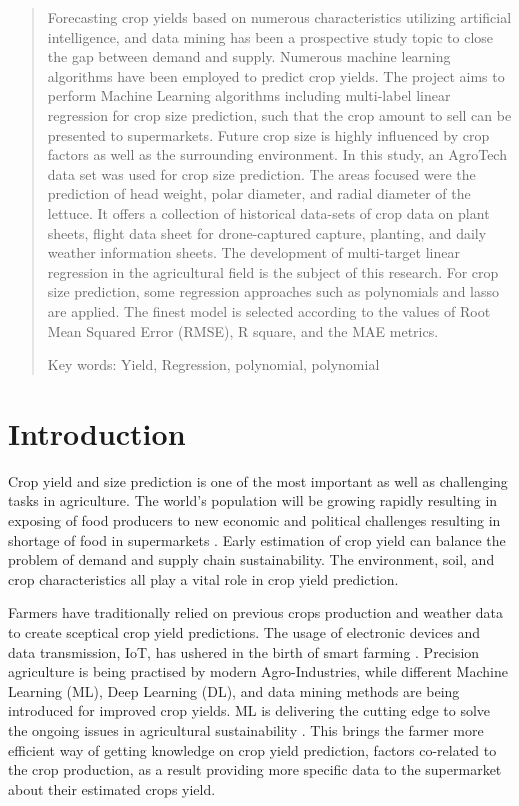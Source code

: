 \documentclass{article}
\begin{document}
\begin{abstract}
Forecasting crop yields based on numerous characteristics utilizing artificial intelligence, and data mining has been a prospective study topic to close the gap between demand and supply. Numerous machine learning algorithms have been employed to predict crop yields. The project aims to perform Machine Learning algorithms including multi-label linear regression for crop size prediction, such that the crop amount to sell can be presented to supermarkets. Future crop size is highly influenced by crop factors as well as the surrounding environment. In this study, an AgroTech data set was used for crop size prediction. The areas focused were the prediction of head weight, polar diameter, and radial diameter of the lettuce. It offers a collection of historical data-sets of crop data on plant sheets, flight data sheet for drone-captured capture, planting, and daily weather information sheets. The development of multi-target linear regression in the agricultural field is the subject of this research. For crop size prediction, some regression approaches such as polynomials and lasso are applied. The finest model is selected according to the values of Root Mean Squared Error (RMSE), R square, and the MAE metrics.

Key words: Yield, Regression, polynomial, polynomial
\end{abstract}


\section{Introduction}
Crop yield and size prediction is one of the most important as well as challenging tasks in agriculture. The world's population will be growing rapidly resulting in exposing of food producers to new economic and political challenges resulting in shortage of food in supermarkets \cite{britain2011government}. Early estimation of crop yield can balance the problem of demand and supply chain sustainability. The environment, soil, and crop characteristics all play a vital role in crop yield prediction.

Farmers have traditionally relied on previous crops production and weather data to create sceptical crop yield predictions. The usage of electronic devices and data transmission, IoT, has ushered in the birth of smart farming \cite{PIVOTO201821}. Precision agriculture is being practised by modern Agro-Industries, while different Machine Learning (ML), Deep Learning (DL), and data mining methods are being introduced for improved crop yields. ML is delivering the cutting edge to solve the ongoing issues in agricultural sustainability \cite{9311735}. This brings the farmer more efficient way of getting knowledge on crop yield prediction, factors co-related to the crop production, as a result providing more specific data to the supermarket about their estimated crops yield. 
\end{document}
